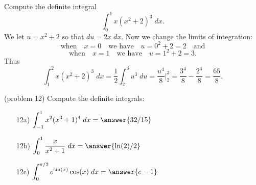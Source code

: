 \documentclass{ximera}
\begin{document}
\begin{example}[example12]
Compute the definite integral 
\[
\int_0^1 x(x^2 + 2)^3 \; dx.
\]
We let $u = x^2 + 2$ so that $du = 2x \; dx$. Now we change the limits of integration: 
\[
\text{when} \quad x = 0 \quad \text{we have} \quad u = 0^2 + 2 = 2  \quad \text{and}
\]
\[ 
\text{when} \quad x = 1 \quad \text{we have} \quad u = 1^2 + 2 = 3.
\]
Thus
\[
\int_1^2 x(x^2 + 2)^3 \; dx = \frac12 \int_2^3 u^3 \; du = \frac{u^4}{8}\bigg|_2^3 = \frac{3^4}{8} - \frac{2^4}{8} = \frac{65}{8}.
\]
\end{example}

\begin{problem}(problem 12) Compute the definite integrals:
\begin{itemize}
\item[12a)] \; $\displaystyle{\int_{-1}^1 x^2(x^3 + 1)^4 \; dx = \answer{32/15}}$
\item[12b)] \; $\displaystyle{\int_0^1 \frac{x}{x^2 + 1}\; dx = \answer{\ln(2)/2}}$
\item[12c)] \; $\displaystyle{\int_0^{\pi/2} e^{\sin(x)} \cos(x) \; dx = \answer{e-1}}$
\end{itemize}
\end{problem}
\end{document}
